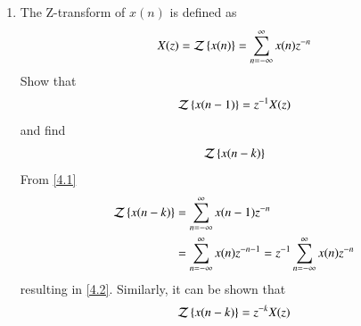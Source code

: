 \documentclass[journal,12pt,twocolumn]{IEEEtran}
\renewcommand\thesection{\arabic{section}}
\begin{document}
\begin{enumerate}[label=\thesection.\arabic*
,ref=\thesection.\theenumi]
\item The Z-transform of $x(n)$ is defined as 
\begin{align}\label{4.1}
	X(z) = \mathcal{Z}\left\{x(n)\right\} = \sum_{n=-\infty}^\infty x(n) z^{-n}
\end{align}
Show that
\begin{align}\label{4.2}
	\mathcal{Z}\left\{x(n-1)\right\} = z^{-1}X(z)
\end{align}
and find
\begin{align}
	\mathcal{Z}\left\{x(n-k)\right\}
\end{align}
\solution From \eqref{4.1}
\begin{align}
	\mathcal{Z}\left\{x(n-k)\right\} &= \sum_{n=-\infty}^\infty x(n-1)z^{-n}\\
	&= \sum_{n=-\infty}^\infty x(n)z^{-n-1}= z^{-1}\sum_{n=-\infty}^\infty x(n)z^{-n}
\end{align}
resulting in \eqref{4.2}. Similarly, it can be shown that 
\begin{align}\label{4.6}
	\mathcal{Z}\left\{x(n-k)\right\} = z^{-k}X(z)
\end{align}



\end{enumerate}
\end{document}
